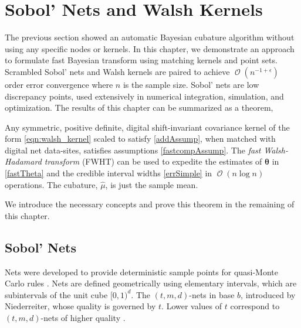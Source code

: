 \documentclass{svjour3}                     %
\DeclareMathOperator{\Order}{{\mathcal O}}
\newcommand{\bm}[1]{\boldsymbol{#1}}
\newcommand{\vtheta}{{\bm{\theta}}}
\newcommand{\hmu}{\widehat{\mu}}
\begin{document}
 

\section{Sobol' Nets and Walsh Kernels}
\label{sec:sobol_walsh}



The previous section showed an automatic Bayesian cubature algorithm without using any specific nodes or kernels. 
In this chapter, we demonstrate an approach to formulate fast Bayesian transform using matching kernels and point sets. 
Scrambled Sobol' nets and Walsh kernels are paired to achieve $\Order(n^{-1 + \epsilon})$ order error convergence where $n$ is the sample size. 
Sobol' nets \cite{Sob67} are low discrepancy points, used extensively in numerical integration, simulation, and optimization. 
The results of this chapter can be summarized as a theorem,



\begin{theorem}
	Any symmetric, positive definite, digital shift-invariant covariance kernel of the form \eqref{eqn:walsh_kernel} scaled to satisfy \eqref{addAssump}, when matched with digital net data-sites, satisfies assumptions \eqref{fastcompAssump}.  The \emph{fast Walsh-Hadamard transform} (FWHT) can be used to expedite the estimates of $\vtheta$ in \eqref{fastTheta} and the credible interval widths \eqref{errSimple} in $\Order(n \log n)$ operations. The cubature, $\hmu$, is just the sample mean.
\end{theorem}
We introduce the necessary concepts and prove this theorem in the remaining of this chapter.

\subsection{Sobol' Nets}


Nets were developed to provide deterministic sample points for quasi-Monte Carlo rules \cite{Nie05a}. Nets are defined geometrically using elementary intervals, which are subintervals of the unit cube $[0,1)^d$.
The $(t,m, d)$-nets in base $b$, introduced by Niederreiter, 
whose quality is governed by $t$. Lower values of $t$ correspond to $(t,m, d)$-nets of higher quality \cite{Bald10a}.
\end{document}
